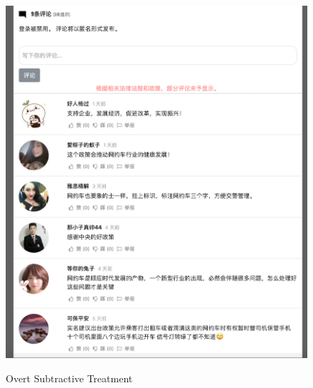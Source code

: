 \documentclass[11pt]{article}
\begin{document}
\begin{figure}
  \centering
  \caption{Overt Subtractive Treatment}
  \vspace{1em}
  \includegraphics[width=\textwidth]{figures/overt_subtractive.png}
  \label{overt_subtractive}
\end{figure}
\end{document}
